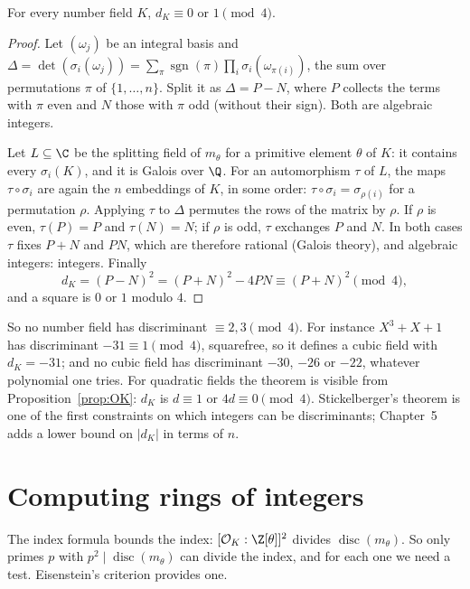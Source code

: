 \begin{theorem}[Stickelberger, 1897]\label{thm:stickelberger}
For every number field $K$, $d_K\equiv0$ or $1\pmod 4$.
\end{theorem}
\begin{proof}
Let $(\omega_j)$ be an integral basis and $\Delta=\det(\sigma_i(\omega_j))=\sum_\pi\operatorname{sgn}(\pi)\prod_i
\sigma_i(\omega_{\pi(i)})$, the sum over permutations $\pi$ of $\{1,\dots,n\}$. Split it as $\Delta=P-N$, where $P$
collects the terms with $\pi$ even and $N$ those with $\pi$ odd (without their sign). Both are algebraic integers.

Let $L\subseteq\C$ be the splitting field of $m_\theta$ for a primitive element $\theta$ of $K$: it contains every
$\sigma_i(K)$, and it is Galois over $\Q$. For an automorphism $\tau$ of $L$, the maps $\tau\circ\sigma_i$ are again the
$n$ embeddings of $K$, in some order: $\tau\circ\sigma_i=\sigma_{\rho(i)}$ for a permutation $\rho$. Applying $\tau$ to
$\Delta$ permutes the rows of the matrix by $\rho$. If $\rho$ is even, $\tau(P)=P$ and $\tau(N)=N$; if $\rho$ is odd,
$\tau$ exchanges $P$ and $N$. In both cases $\tau$ fixes $P+N$ and $PN$, which are therefore rational (Galois
theory), and algebraic integers: integers. Finally
\[
d_K=(P-N)^2=(P+N)^2-4PN\equiv(P+N)^2\pmod 4,
\]
and a square is $0$ or $1$ modulo $4$.
\end{proof}

So no number field has discriminant $\equiv2,3\pmod4$. For instance $X^3+X+1$ has discriminant $-31\equiv1\pmod4$,
squarefree, so it defines a cubic field with $d_K=-31$; and no cubic field has discriminant $-30$, $-26$ or $-22$,
whatever polynomial one tries. For quadratic fields the theorem is visible from Proposition~\ref{prop:OK}: $d_K$ is $d\equiv1$ or
$4d\equiv0\pmod 4$. Stickelberger's theorem is one of the first constraints on which integers can be discriminants;
Chapter~5 adds a lower bound on $|d_K|$ in terms of $n$.

\section{Computing rings of integers}

The index formula bounds the index: $[\mathcal O_K:\Z[\theta]]^2$ divides $\operatorname{disc}(m_\theta)$. So only primes
$p$ with $p^2\mid\operatorname{disc}(m_\theta)$ can divide the index, and for each one we need a test. Eisenstein's
criterion provides one.

